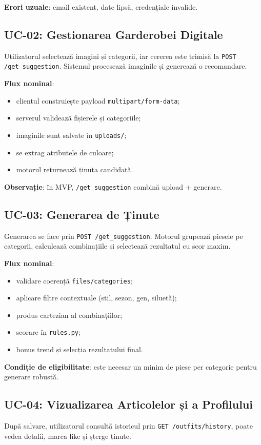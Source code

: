 \textbf{Erori uzuale}: email existent, date lipsă, credențiale invalide.

\subsection*{UC-02: Gestionarea Garderobei Digitale}
Utilizatorul selectează imagini și categorii, iar cererea este trimisă la \texttt{POST /get\_suggestion}. Sistemul procesează imaginile și generează o recomandare.

\textbf{Flux nominal}:
\begin{itemize}
    \item clientul construiește payload \texttt{multipart/form-data};
    \item serverul validează fișierele și categoriile;
    \item imaginile sunt salvate în \texttt{uploads/};
    \item se extrag atributele de culoare;
    \item motorul returnează ținuta candidată.
\end{itemize}

\textbf{Observație}: în MVP, \texttt{/get\_suggestion} combină upload + generare.

\subsection*{UC-03: Generarea de Ținute}
Generarea se face prin \texttt{POST /get\_suggestion}. Motorul grupează piesele pe categorii, calculează combinațiile și selectează rezultatul cu scor maxim.

\textbf{Flux nominal}:
\begin{itemize}
    \item validare coerență \texttt{files/categories};
    \item aplicare filtre contextuale (stil, sezon, gen, siluetă);
    \item produs cartezian al combinațiilor;
    \item scorare în \texttt{rules.py};
    \item bonus trend și selecția rezultatului final.
\end{itemize}

\textbf{Condiție de eligibilitate}: este necesar un minim de piese per categorie pentru generare robustă.

\subsection*{UC-04: Vizualizarea Articolelor și a Profilului}
După salvare, utilizatorul consultă istoricul prin \texttt{GET /outfits/history}, poate vedea detalii, marca like și șterge ținute.

